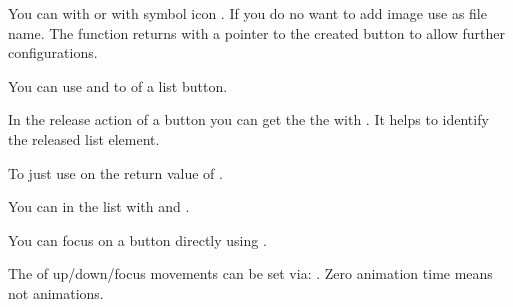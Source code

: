 \documentclass[letterpaper,10pt,english]{sphinxmanual}
\begin{document}
You can  with  or with symbol icon . If you do no want to add image use  as file name. The function returns with a pointer to the created button to allow further configurations.

You can use  and  to  of a list button.

In the release action of a button you can get the the  with . It helps to identify the released list element.

To  just use  on the return value of .

You can  in the list with  and .

You can focus on a button directly using .

The  of up/down/focus movements can be set via: . Zero animation time means not animations.
\end{document}
